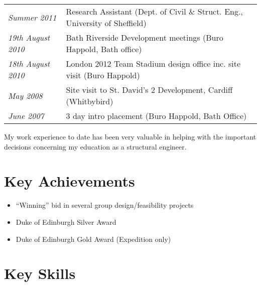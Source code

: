 \documentclass[oneside,a4paper]{article}
\begin{document}
\hspace{-6pt}\begin{tabular}{>{\it}ll}
Summer 2011 & Research Assistant (Dept. of Civil \& Struct. Eng., University of Sheffield) \\ %
19th August 2010 & Bath Riverside Development meetings (Buro Happold, Bath office) \\
18th August 2010	 & London 2012 Team Stadium design office inc. site visit (Buro Happold) \\
May 2008	 & Site visit to St. David's 2 Development, Cardiff (Whitbybird) \\
June 2007 & 3 day intro placement (Buro Happold, Bath Office)
\end{tabular}

My work experience to date has been very valuable in helping with the important decisions concerning my education as a structural engineer.

\section*{Key Achievements}

\begin{itemize}
\item ``Winning'' bid in several group design/feasibility projects
\item Duke of Edinburgh Silver Award
\item Duke of Edinburgh Gold Award (Expedition only)
\end{itemize}

\section*{Key Skills}
\end{document}
